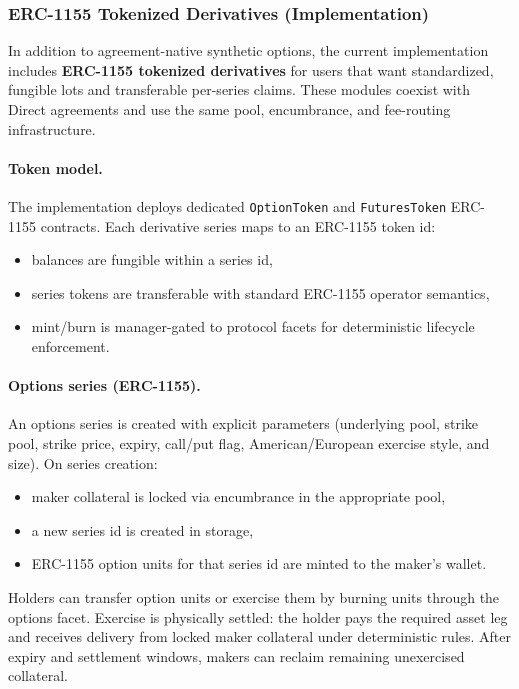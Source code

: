 \documentclass[version=preprint]{iacrcc}
\begin{document}
\subsubsection{ERC-1155 Tokenized Derivatives (Implementation)}

In addition to agreement-native synthetic options, the current implementation includes \textbf{ERC-1155 tokenized derivatives} for users that want standardized, fungible lots and transferable per-series claims. These modules coexist with Direct agreements and use the same pool, encumbrance, and fee-routing infrastructure.

\paragraph{Token model.}
The implementation deploys dedicated \texttt{OptionToken} and \texttt{FuturesToken} ERC-1155 contracts. Each derivative series maps to an ERC-1155 token id:
\begin{itemize}
  \item balances are fungible within a series id,
  \item series tokens are transferable with standard ERC-1155 operator semantics,
  \item mint/burn is manager-gated to protocol facets for deterministic lifecycle enforcement.
\end{itemize}

\paragraph{Options series (ERC-1155).}
An options series is created with explicit parameters (underlying pool, strike pool, strike price, expiry, call/put flag, American/European exercise style, and size). On series creation:
\begin{itemize}
  \item maker collateral is locked via encumbrance in the appropriate pool,
  \item a new series id is created in storage,
  \item ERC-1155 option units for that series id are minted to the maker's wallet.
\end{itemize}
Holders can transfer option units or exercise them by burning units through the options facet. Exercise is physically settled: the holder pays the required asset leg and receives delivery from locked maker collateral under deterministic rules. After expiry and settlement windows, makers can reclaim remaining unexercised collateral.
\end{document}
